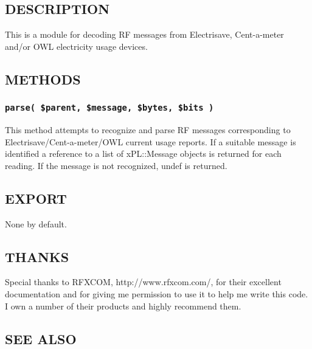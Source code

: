 \documentclass[12pt,a4paper]{article}
\begin{document}
\subsection*{DESCRIPTION\label{xPL::RF::Electrisave_DESCRIPTION}}


This is a module for decoding RF messages from Electrisave,
Cent-a-meter and/or OWL electricity usage devices.

\subsection*{METHODS\label{xPL::RF::Electrisave_METHODS}}
\subsubsection*{\texttt{parse( \$parent, \$message, \$bytes, \$bits )}\label{xPL::RF::Electrisave_parse_parent_message_bytes_bits_}}


This method attempts to recognize and parse RF messages corresponding
to Electrisave/Cent-a-meter/OWL current usage reports.  If a suitable
message is identified a reference to a list of xPL::Message objects is
returned for each reading.  If the message is not recognized, undef is
returned.

\subsection*{EXPORT\label{xPL::RF::Electrisave_EXPORT}}


None by default.

\subsection*{THANKS\label{xPL::RF::Electrisave_THANKS}}


Special thanks to RFXCOM, \textsf{http://www.rfxcom.com/}, for their
excellent documentation and for giving me permission to use it to help
me write this code.  I own a number of their products and highly
recommend them.

\subsection*{SEE ALSO\label{xPL::RF::Electrisave_SEE_ALSO}}
\end{document}
